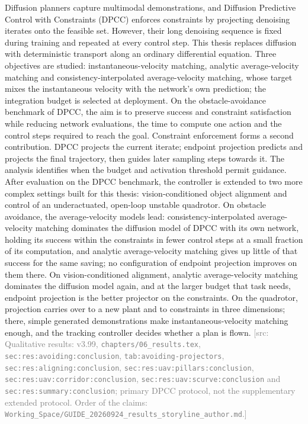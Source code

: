 \documentclass[headsepline,footsepline,footinclude=false,oneside,fontsize=11pt,paper=a4,listof=totoc,bibliography=totoc]{scrbook}
\theoremstyle{definition}
\theoremstyle{plain}
\theoremstyle{remark}
\newif\ifsubmission
\newcommand{\srcnote}[1]{\ifsubmission\else\textcolor{gray}{\footnotesize\textsf{[src: #1]}}\fi}
\begin{document}
\ifstandalone
Diffusion planners capture multimodal demonstrations, and Diffusion Predictive Control with
Constraints (DPCC) enforces constraints by projecting denoising iterates onto the feasible set.
However, their long denoising sequence is fixed during training and repeated at every control step.
This thesis replaces diffusion with deterministic transport along an ordinary differential equation.
Three objectives are studied: instantaneous-velocity matching, analytic average-velocity matching and
consistency-interpolated average-velocity matching, whose target mixes the instantaneous velocity with
the network's own prediction; the integration budget is selected at deployment. On the
obstacle-avoidance benchmark of DPCC, the aim is to preserve success and
constraint satisfaction while reducing network evaluations, the time to compute one action and the
control steps required to reach the goal. Constraint enforcement forms a second contribution. DPCC projects the
current iterate; endpoint projection predicts and projects the final trajectory,
then guides later sampling steps towards it. The analysis identifies when the budget and activation threshold permit guidance. After evaluation on the DPCC benchmark, the controller is extended to two
more complex settings built for this thesis: vision-conditioned object alignment and control of an
underactuated, open-loop unstable quadrotor. On obstacle avoidance, the average-velocity models lead:
consistency-interpolated average-velocity matching dominates the diffusion model of DPCC with its own
network, holding its success within the constraints in fewer control steps at a small fraction of its
computation, and analytic average-velocity matching gives up little of that success for the same
saving; no configuration of endpoint projection improves on them there. On vision-conditioned
alignment, analytic average-velocity matching dominates the diffusion model again, and at the larger
budget that task needs, endpoint projection is the better projector on the constraints. On the
quadrotor, projection carries over to a new plant and to constraints in three dimensions; there,
simple generated demonstrations make instantaneous-velocity matching enough, and the tracking
controller decides whether a plan is flown.
\fi
\srcnote{Qualitative results: v3.99, \texttt{chapters/06\_results.tex},
\texttt{sec:res:avoiding:conclusion}, \texttt{tab:avoiding-projectors},
\texttt{sec:res:aligning:conclusion}, \texttt{sec:res:uav:pillars:conclusion},
\texttt{sec:res:uav:corridor:conclusion}, \texttt{sec:res:uav:scurve:conclusion} and
\texttt{sec:res:summary:conclusion}; primary DPCC protocol, not the supplementary extended protocol.
Order of the claims: \texttt{Working\_Space/GUIDE\_20260924\_results\_storyline\_author.md}.}
\end{document}
